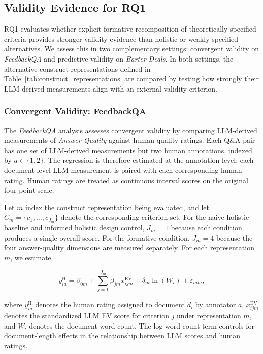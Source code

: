 \subsection{Validity Evidence for RQ1}\label{sec:methods_rq1}

RQ1 evaluates whether explicit formative recomposition of theoretically specified criteria provides stronger validity evidence than holistic or weakly specified alternatives. We assess this in two complementary settings: convergent validity on \textit{FeedbackQA} and predictive validity on \textit{Barter Deals}. In both settings, the alternative construct representations defined in Table~\ref{tab:construct_representations} are compared by testing how strongly their LLM-derived measurements align with an external validity criterion.

\subsubsection{Convergent Validity: FeedbackQA}\label{sec:methods_feedbackqa}

The \textit{FeedbackQA} analysis assesses convergent validity by comparing LLM-derived measurements of \textit{Answer Quality} against human quality ratings. Each Q\&A pair has one set of LLM-derived measurements but two human annotations, indexed by $a \in \{1,2\}$. The regression is therefore estimated at the annotation level: each document-level LLM measurement is paired with each corresponding human rating. Human ratings are treated as continuous interval scores on the original four-point scale.

Let $m$ index the construct representation being evaluated, and let $C_m = \{c_1,\ldots,c_{J_m}\}$ denote the corresponding criterion set. For the naive holistic baseline and informed holistic design control, $J_m=1$ because each condition produces a single overall score. For the formative condition, $J_m=4$ because the four answer-quality dimensions are measured separately. For each representation $m$, we estimate

\begin{equation}\label{eq:feedbackqa_regression}
    y^{\mathrm{H}}_{ia}
    =
    \beta_{0m}
    +
    \sum_{j=1}^{J_m}
    \beta_{jm} x^{\mathrm{EV}}_{ijm}
    +
    \delta_m \ln(W_i)
    +
    \varepsilon_{iam},
\end{equation}

where $y^{\mathrm{H}}_{ia}$ denotes the human rating assigned to document $d_i$ by annotator $a$, $x^{\mathrm{EV}}_{ijm}$ denotes the standardized LLM EV score for criterion $j$ under representation $m$, and $W_i$ denotes the document word count. The log word-count term controls for document-length effects in the relationship between LLM scores and human ratings.

